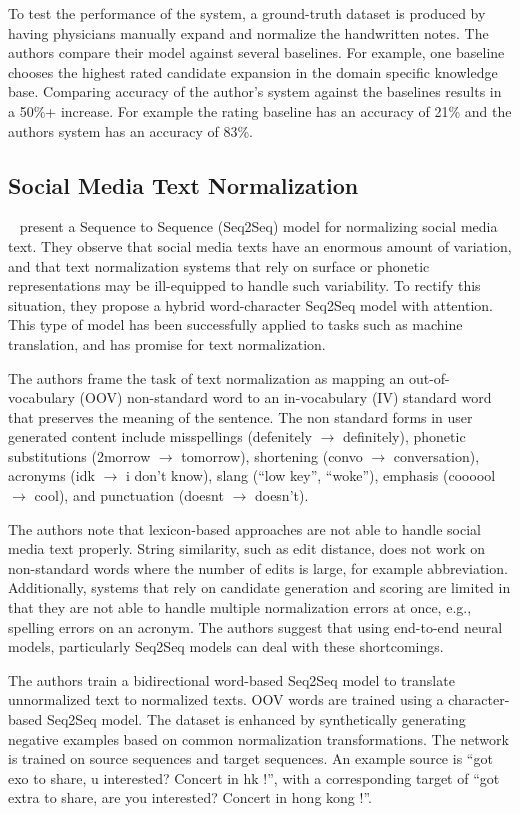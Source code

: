 \documentclass[11pt,a4paper]{article}
\begin{document}
To test the performance of the system, a ground-truth dataset is
produced by having physicians manually expand and normalize the
handwritten notes.  The authors compare their model against several
baselines.  For example, one baseline chooses the highest rated
candidate expansion in the domain specific knowledge base.  Comparing
accuracy of the author’s system against the baselines results in a
50\%+ increase.  For example the rating baseline has an accuracy of 21\%
and the authors system has an accuracy of 83\%.

\subsection{Social Media Text Normalization}
~\cite{Lourentzo:2019} present a Sequence to Sequence (Seq2Seq) model
for normalizing social media text.  They observe that social media
texts have an enormous amount of variation, and that text
normalization systems that rely on surface or phonetic representations
may be ill-equipped to handle such variability.  To rectify this
situation, they propose a hybrid word-character Seq2Seq model with
attention.  This type of model has been successfully applied to tasks
such as machine translation, and has promise for text normalization.

The authors frame the task of text normalization as mapping an
out-of-vocabulary (OOV) non-standard word to an in-vocabulary (IV)
standard word that preserves the meaning of the sentence.  The non
standard forms in user generated content include misspellings
(defenitely $\rightarrow$ definitely), phonetic substitutions (2morrow $\rightarrow$
tomorrow), shortening (convo $\rightarrow$ conversation), acronyms (idk $\rightarrow$ i don’t
know), slang (``low key'', ``woke''), emphasis (coooool $\rightarrow$ cool), and
punctuation  
(doesnt $\rightarrow$ doesn't).

The authors note that lexicon-based approaches are not able to handle
social media text properly.  String similarity, such as edit distance,
does not work on non-standard words where the number of edits is
large, for example abbreviation.   Additionally, systems that rely on
candidate generation and scoring are limited in that they are not able
to handle multiple normalization errors at once, e.g., spelling errors
on an acronym.  The authors suggest that using end-to-end neural
models, particularly Seq2Seq models can deal with these shortcomings.

The authors train a bidirectional word-based Seq2Seq model to
translate unnormalized text to normalized texts.  OOV words are
trained using a character-based Seq2Seq model.  The dataset is
enhanced by synthetically generating negative examples based on common
normalization transformations.    The network is trained on source
sequences and target sequences.  An example source is ``got exo to
share, u interested?  Concert in hk !'', with a corresponding target of
``got extra to share, are you interested?  Concert in hong kong !''.
\end{document}
